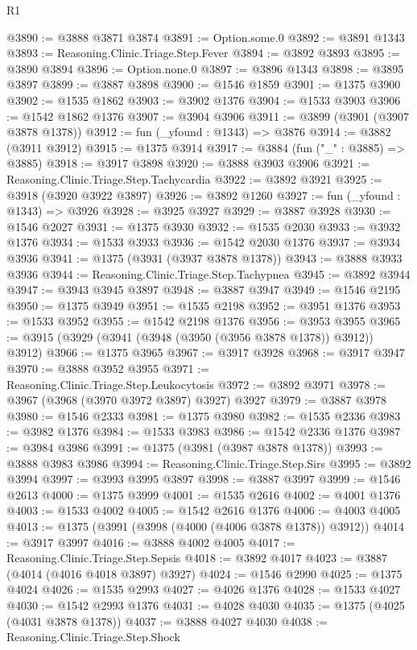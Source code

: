 \begin{lexlean}{R1}
\begin{coremodule}
@3890 := @3888 @3871 @3874
@3891 := Option.some.{0}
@3892 := @3891 @1343
@3893 := Reasoning.Clinic.Triage.Step.Fever
@3894 := @3892 @3893
@3895 := @3890 @3894
@3896 := Option.none.{0}
@3897 := @3896 @1343
@3898 := @3895 @3897
@3899 := @3887 @3898
@3900 := @1546 @1859
@3901 := @1375 @3900
@3902 := @1535 @1862
@3903 := @3902 @1376
@3904 := @1533 @3903
@3906 := @1542 @1862 @1376
@3907 := @3904 @3906
@3911 := @3899 (@3901 (@3907 @3878 @1378))
@3912 := fun (_yfound : @1343) => @3876
@3914 := @3882 (@3911 @3912)
@3915 := @1375 @3914
@3917 := @3884 (fun ("_" : @3885) => @3885)
@3918 := @3917 @3898
@3920 := @3888 @3903 @3906
@3921 := Reasoning.Clinic.Triage.Step.Tachycardia
@3922 := @3892 @3921
@3925 := @3918 (@3920 @3922 @3897)
@3926 := @3892 @1260
@3927 := fun (_yfound : @1343) => @3926
@3928 := @3925 @3927
@3929 := @3887 @3928
@3930 := @1546 @2027
@3931 := @1375 @3930
@3932 := @1535 @2030
@3933 := @3932 @1376
@3934 := @1533 @3933
@3936 := @1542 @2030 @1376
@3937 := @3934 @3936
@3941 := @1375 (@3931 (@3937 @3878 @1378))
@3943 := @3888 @3933 @3936
@3944 := Reasoning.Clinic.Triage.Step.Tachypnea
@3945 := @3892 @3944
@3947 := @3943 @3945 @3897
@3948 := @3887 @3947
@3949 := @1546 @2195
@3950 := @1375 @3949
@3951 := @1535 @2198
@3952 := @3951 @1376
@3953 := @1533 @3952
@3955 := @1542 @2198 @1376
@3956 := @3953 @3955
@3965 := @3915 (@3929 (@3941 (@3948 (@3950 (@3956 @3878 @1378)) @3912)) @3912)
@3966 := @1375 @3965
@3967 := @3917 @3928
@3968 := @3917 @3947
@3970 := @3888 @3952 @3955
@3971 := Reasoning.Clinic.Triage.Step.Leukocytosis
@3972 := @3892 @3971
@3978 := @3967 (@3968 (@3970 @3972 @3897) @3927) @3927
@3979 := @3887 @3978
@3980 := @1546 @2333
@3981 := @1375 @3980
@3982 := @1535 @2336
@3983 := @3982 @1376
@3984 := @1533 @3983
@3986 := @1542 @2336 @1376
@3987 := @3984 @3986
@3991 := @1375 (@3981 (@3987 @3878 @1378))
@3993 := @3888 @3983 @3986
@3994 := Reasoning.Clinic.Triage.Step.Sirs
@3995 := @3892 @3994
@3997 := @3993 @3995 @3897
@3998 := @3887 @3997
@3999 := @1546 @2613
@4000 := @1375 @3999
@4001 := @1535 @2616
@4002 := @4001 @1376
@4003 := @1533 @4002
@4005 := @1542 @2616 @1376
@4006 := @4003 @4005
@4013 := @1375 (@3991 (@3998 (@4000 (@4006 @3878 @1378)) @3912))
@4014 := @3917 @3997
@4016 := @3888 @4002 @4005
@4017 := Reasoning.Clinic.Triage.Step.Sepsis
@4018 := @3892 @4017
@4023 := @3887 (@4014 (@4016 @4018 @3897) @3927)
@4024 := @1546 @2990
@4025 := @1375 @4024
@4026 := @1535 @2993
@4027 := @4026 @1376
@4028 := @1533 @4027
@4030 := @1542 @2993 @1376
@4031 := @4028 @4030
@4035 := @1375 (@4025 (@4031 @3878 @1378))
@4037 := @3888 @4027 @4030
@4038 := Reasoning.Clinic.Triage.Step.Shock

\end{coremodule}
\end{lexlean}
